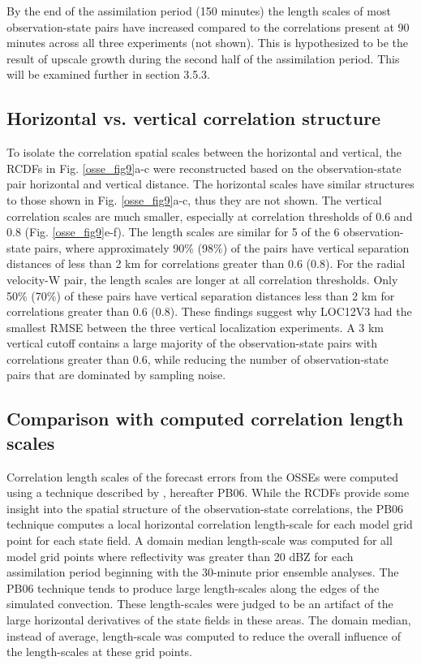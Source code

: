 By the end of the assimilation period (150 minutes) the length scales of most observation-state pairs have increased compared to the correlations present at 90 minutes across all three experiments (not shown). This is hypothesized to be the result of upscale growth during the second half of the assimilation period. This will be examined further in section 3.5.3.

\subsection{Horizontal vs. vertical correlation structure}
To isolate the correlation spatial scales between the horizontal and vertical, the RCDFs in Fig. \ref{osse_fig9}a-c were reconstructed based on the observation-state pair horizontal and vertical distance. The horizontal scales have similar structures to those shown in Fig. \ref{osse_fig9}a-c, thus they are not shown. The vertical correlation scales are much smaller, especially at correlation thresholds of 0.6 and 0.8 (Fig. \ref{osse_fig9}e-f). The length scales are similar for 5 of the 6 observation-state pairs, where approximately 90\% (98\%) of the pairs have vertical separation distances of less than 2 km for correlations greater than 0.6 (0.8). For the radial velocity-W pair, the length scales are longer at all correlation thresholds. Only 50\% (70\%) of these pairs have vertical separation distances less than 2 km for correlations greater than 0.6 (0.8). These findings suggest why LOC12V3 had the smallest RMSE between the three vertical localization experiments. A 3 km vertical cutoff contains a large majority of the observation-state pairs with correlations greater than 0.6, while reducing the number of observation-state pairs that are dominated by sampling noise.


\subsection{Comparison with computed correlation length scales}
Correlation length scales of the forecast errors from the OSSEs were computed using a technique described by \citet{pereiraberre06}, hereafter PB06. While the RCDFs provide some insight into the spatial structure of the observation-state correlations, the PB06 technique computes a local horizontal correlation length-scale for each model grid point for each state field. A domain median length-scale was computed for all model grid points where reflectivity was greater than 20 dBZ for each assimilation period beginning with the 30-minute prior ensemble analyses. The PB06 technique tends to produce large length-scales along the edges of the simulated convection. These length-scales were judged to be an artifact of the large horizontal derivatives of the state fields in these areas. The domain median, instead of average, length-scale was computed to reduce the overall influence of the length-scales at these grid points.


